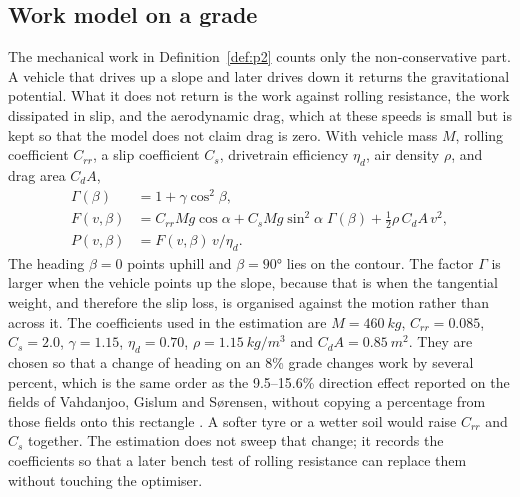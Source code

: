 \subsection{Work model on a grade}

The mechanical work in Definition~\ref{def:p2} counts only the non-conservative part. A vehicle that drives up a slope and later drives down it returns the gravitational potential. What it does not return is the work against rolling resistance, the work dissipated in slip, and the aerodynamic drag, which at these speeds is small but is kept so that the model does not claim drag is zero. With vehicle mass \(M\), rolling coefficient \(C_{rr}\), a slip coefficient \(C_s\), drivetrain efficiency \(\eta_d\), air density \(\rho\), and drag area \(C_dA\),
\begin{equation}
\label{eq:fpm}
\begin{aligned}
\Gamma(\beta) &= 1 + \gamma\cos^2\beta,\\
F(v,\beta) &= C_{rr} Mg\cos\alpha + C_s Mg\sin^2\alpha\;\Gamma(\beta) + \tfrac12\rho\, C_dA\, v^2,\\
P(v,\beta) &= F(v,\beta)\, v / \eta_d .
\end{aligned}
\end{equation}
The heading \(\beta=0\) points uphill and \(\beta=\ang{90}\) lies on the contour. The factor \(\Gamma\) is larger when the vehicle points up the slope, because that is when the tangential weight, and therefore the slip loss, is organised against the motion rather than across it. The coefficients used in the estimation are \(M=\SI{460}{kg}\), \(C_{rr}=0.085\), \(C_s=2.0\), \(\gamma=1.15\), \(\eta_d=0.70\), \(\rho=\SI{1.15}{kg/m^3}\) and \(C_dA=\SI{0.85}{m^2}\). They are chosen so that a change of heading on an \num{8}\% grade changes work by several percent, which is the same order as the \numrange{9.5}{15.6}\% direction effect reported on the fields of Vahdanjoo, Gislum and S{\o}rensen, without copying a percentage from those fields onto this rectangle \cite{vahdanjoo2023}. A softer tyre or a wetter soil would raise \(C_{rr}\) and \(C_s\) together. The estimation does not sweep that change; it records the coefficients so that a later bench test of rolling resistance can replace them without touching the optimiser.

